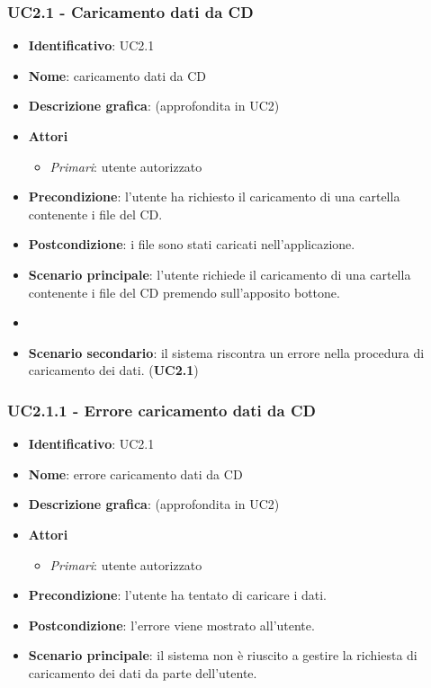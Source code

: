 \subsubsection{UC2.1 - Caricamento dati da CD}
\begin{itemize}
  \item \textbf{Identificativo}: UC2.1
  \item \textbf{Nome}: caricamento dati da CD
  \item \textbf{Descrizione grafica}: (approfondita in UC2)
  \item \textbf{Attori}
        \begin{itemize}
          \item \textit{Primari}: utente autorizzato
        \end{itemize}
  \item \textbf{Precondizione}: l'utente ha richiesto il caricamento di una cartella contenente i file del CD.
  \item \textbf{Postcondizione}: i file sono stati caricati nell'applicazione.
  \item \textbf{Scenario principale}: l'utente richiede il caricamento di una cartella contenente i file del CD premendo sull'apposito bottone.
  \item \item \textbf{Scenario secondario}: il sistema riscontra un errore nella procedura di caricamento dei dati. (\textbf{UC2.1})
\end{itemize}

\subsubsection{UC2.1.1 - Errore caricamento dati da CD}
\begin{itemize}
  \item \textbf{Identificativo}: UC2.1
  \item \textbf{Nome}: errore caricamento dati da CD
  \item \textbf{Descrizione grafica}: (approfondita in UC2)
  \item \textbf{Attori}
        \begin{itemize}
          \item \textit{Primari}: utente autorizzato
        \end{itemize}
  \item \textbf{Precondizione}: l'utente ha tentato di caricare i dati.
  \item \textbf{Postcondizione}: l'errore viene mostrato all'utente.
  \item \textbf{Scenario principale}: il sistema non è riuscito a gestire la richiesta di caricamento dei dati da parte dell'utente.
\end{itemize}
\newpage